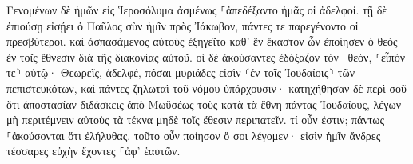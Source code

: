 \documentclass{openreader}
\begin{document}
Γενομένων δὲ ἡμῶν εἰς Ἱεροσόλυμα ἀσμένως ⸀ἀπεδέξαντο ἡμᾶς οἱ ἀδελφοί. 
τῇ δὲ ἐπιούσῃ εἰσῄει ὁ Παῦλος σὺν ἡμῖν πρὸς Ἰάκωβον, πάντες τε παρεγένοντο οἱ πρεσβύτεροι. 
καὶ ἀσπασάμενος αὐτοὺς ἐξηγεῖτο καθ’ ἓν ἕκαστον ὧν ἐποίησεν ὁ θεὸς ἐν τοῖς ἔθνεσιν διὰ τῆς διακονίας αὐτοῦ. 
οἱ δὲ ἀκούσαντες ἐδόξαζον τὸν ⸀θεόν, ⸂εἶπόν τε⸃ αὐτῷ· Θεωρεῖς, ἀδελφέ, πόσαι μυριάδες εἰσὶν ⸂ἐν τοῖς Ἰουδαίοις⸃ τῶν πεπιστευκότων, καὶ πάντες ζηλωταὶ τοῦ νόμου ὑπάρχουσιν· 
κατηχήθησαν δὲ περὶ σοῦ ὅτι ἀποστασίαν διδάσκεις ἀπὸ Μωϋσέως τοὺς κατὰ τὰ ἔθνη πάντας Ἰουδαίους, λέγων μὴ περιτέμνειν αὐτοὺς τὰ τέκνα μηδὲ τοῖς ἔθεσιν περιπατεῖν. 
τί οὖν ἐστιν; πάντως ⸀ἀκούσονται ὅτι ἐλήλυθας. 
τοῦτο οὖν ποίησον ὅ σοι λέγομεν· εἰσὶν ἡμῖν ἄνδρες τέσσαρες εὐχὴν ἔχοντες ⸀ἀφ’ ἑαυτῶν. 
\end{document}
